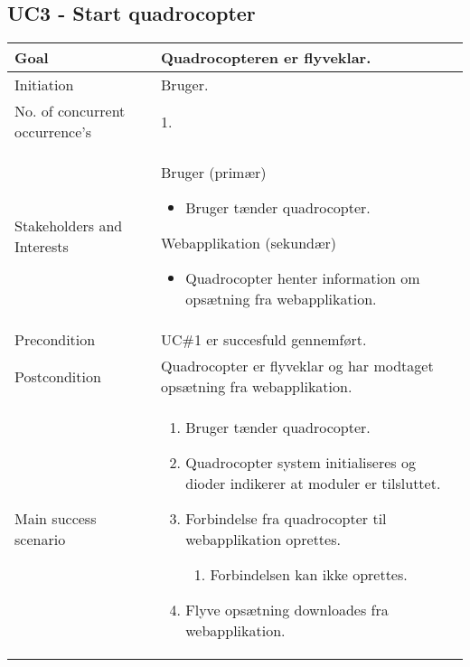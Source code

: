 \subsection*{UC3 - Start quadrocopter}

\begin{table}[H]
\begin{tabular}{|l|p{10cm}|}
\hline

Goal	 								& Quadrocopteren er flyveklar. \\\hline
Initiation 							& Bruger. \\\hline
No. of concurrent occurrence’s		& 1. \\\hline
Stakeholders	and Interests			& Bruger (primær) 
										\begin{itemize}
											\item Bruger tænder quadrocopter.
										\end{itemize} 
									  Webapplikation (sekundær)
										\begin{itemize}
											\item Quadrocopter henter information om opsætning fra webapplikation.
										\end{itemize} \\\hline
Precondition							& UC\#1 er succesfuld gennemført. \\\hline
Postcondition						& Quadrocopter er flyveklar og har modtaget opsætning fra webapplikation. \\\hline
Main success scenario				&
 
									\renewcommand{\labelenumi}{\arabic{enumi}.}
									\renewcommand{\labelenumii}{\Roman{enumii}:}

									\begin{enumerate}[topsep=0.0cm, leftmargin=0.5cm]
										\item Bruger tænder quadrocopter.
										\item Quadrocopter system initialiseres og dioder indikerer at moduler er tilsluttet.
										\item Forbindelse fra quadrocopter til webapplikation oprettes.
											\begin{enumerate}[partopsep=4cm, topsep=0cm, leftmargin=1cm]
												\item Forbindelsen kan ikke oprettes.
											\end{enumerate}
										\item Flyve opsætning downloades fra webapplikation.
									\end{enumerate} \\\hline	


\end{tabular}
\end{table}

